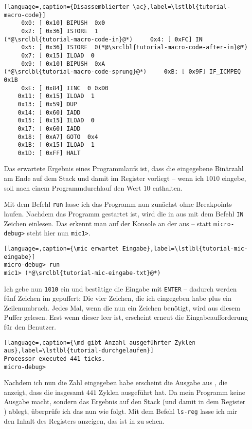 \begin{lstlisting}[language=,caption={Disassemblierter \ac},label=\lstlbl{tutorial-macro-code}]
     0x0: [ 0x10] BIPUSH  0x0
     0x2: [ 0x36] ISTORE  1
(*@\srclbl{tutorial-macro-code-in}@*)     0x4: [ 0xFC] IN 
     0x5: [ 0x36] ISTORE  0(*@\srclbl{tutorial-macro-code-after-in}@*)
     0x7: [ 0x15] ILOAD  0
     0x9: [ 0x10] BIPUSH  0xA
(*@\srclbl{tutorial-macro-code-sprung}@*)     0xB: [ 0x9F] IF_ICMPEQ  0x1B
     0xE: [ 0x84] IINC  0 0xD0
    0x11: [ 0x15] ILOAD  1
    0x13: [ 0x59] DUP 
    0x14: [ 0x60] IADD 
    0x15: [ 0x15] ILOAD  0
    0x17: [ 0x60] IADD 
    0x18: [ 0xA7] GOTO  0x4
    0x1B: [ 0x15] ILOAD  1
    0x1D: [ 0xFF] HALT 
\end{lstlisting}

Das erwartete Ergebnis eines Programmlaufs ist, dass die eingegebene Binärzahl am Ende auf dem Stack und damit im Register  vorliegt -- wenn ich $1010$ eingebe, soll  nach einem Programmdurchlauf den Wert $10$ enthalten.

Mit dem Befehl \texttt{run} lasse ich das Programm nun zunächst ohne Breakpoints laufen. Nachdem das Programm gestartet ist, wird die \mic in  aus  mit dem Befehl \texttt{IN} Zeichen einlesen. Das erkennt man auf der Konsole an der  aus  -- statt \texttt{micro-debug>} steht hier nun \texttt{mic1>}.

\begin{lstlisting}[language=,caption={\mic erwartet Eingabe},label=\lstlbl{tutorial-mic-eingabe}]
micro-debug> run
mic1> (*@\srclbl{tutorial-mic-eingabe-txt}@*)
\end{lstlisting}

Ich gebe nun \texttt{1010} ein und bestätige die Eingabe mit \texttt{ENTER} -- dadurch werden fünf Zeichen im \md gepuffert: Die vier Zeichen, die ich eingegeben habe plus ein Zeilenumbruch. Jedes Mal, wenn die \mic nun ein Zeichen benötigt, wird aus diesem Puffer gelesen. Erst wenn dieser leer ist, erscheint erneut die Eingabeaufforderung für den Benutzer.

\begin{lstlisting}[language=,caption={\md gibt Anzahl ausgeführter Zyklen aus},label=\lstlbl{tutorial-durchgelaufen}]
Processor executed 441 ticks.
micro-debug> 
\end{lstlisting}

Nachdem ich nun die Zahl eingegeben habe erscheint die Ausgabe aus , die anzeigt, dass die \mic insgesamt $441$ Zyklen ausgeführt hat. Da mein Programm keine Ausgabe macht, sondern das Ergebnis auf den Stack (und damit in dem Register ) ablegt, überprüfe ich das nun wie folgt. Mit dem Befehl \texttt{ls-reg} lasse ich mir den Inhalt des Registers  anzeigen, das ist in  zu sehen.

